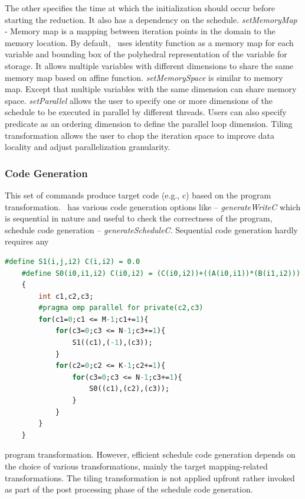 The other specifies the time at which the initialization should occur before starting the reduction. It also has a dependency on the schedule. \textit{setMemoryMap} - Memory map is a mapping between iteration points in the domain to the memory location. By default, \alphaz\ uses identity function as a memory map for each variable and bounding box of the polyhedral representation of the variable for storage. It allows multiple variables with different dimensions to share the same memory map based on affine function. \textit{setMemorySpace} is similar to memory map. Except that multiple variables with the same dimension can share memory space. \textit{setParallel} allows the user to specify one or more dimensions of the schedule to be executed in parallel by different threads. Users can also specify predicate as an ordering dimension to define the parallel loop dimension. Tiling transformation allows the user to chop the iteration space to improve data locality and adjust parallelization granularity.


\subsubsection{Code Generation}
This set of commands produce target code (e.g., c) based on the program transformation. \alphaz\ has various code generation options like – \textit{generateWriteC} which is sequential in nature and useful to check the correctness of the program, schedule code generation – \textit{generateScheduleC}. Sequential code generation hardly requires any
\begin{lstlisting}[language=Caml, caption=Generated code - Matrix multiplication]
    #define S1(i,j,i2) C(i,i2) = 0.0
    #define S0(i0,i1,i2) C(i0,i2) = (C(i0,i2))+((A(i0,i1))*(B(i1,i2)))
    {
        int c1,c2,c3;
        #pragma omp parallel for private(c2,c3)
        for(c1=0;c1 <= M-1;c1+=1){
	        for(c3=0;c3 <= N-1;c3+=1){
	            S1((c1),(-1),(c3));
	        }
            for(c2=0;c2 <= K-1;c2+=1){
                for(c3=0;c3 <= N-1;c3+=1){
                    S0((c1),(c2),(c3));
                }
            }
        }
    }
\end{lstlisting}
program transformation. However, efficient schedule code generation depends on the choice of various transformations, mainly the target mapping-related transformations. The tiling transformation is not applied upfront rather invoked as part of the post processing phase of the schedule code generation. 

